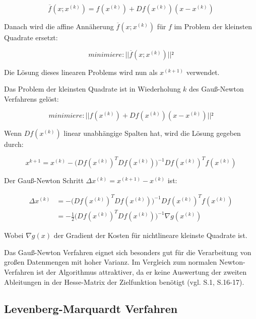 \begin{equation}
\overline{f}(x;x^{(k)}) = f(x^{(k)})+Df(x^{(k)})(x-x^{(k)})
\end{equation}

Danach wird die affine Annäherung $ \overline{f}(x;x^{(k)})$ für $f$ im Problem der kleinsten Quadrate ersetzt:

\begin{equation}
minimiere: ||\overline{f}(x;x^{(k)})||²
\end{equation}

Die Lösung dieses linearen Problems wird nun als $x^{(k+1)}$ verwendet. 

Das Problem der kleinsten Quadrate ist in Wiederholung $k$ des Gauß-Newton Verfahrens gelöst:

\begin{equation}
minimiere: ||f(x^{(k)}) + Df(x^{(k)})(x-x^{(k)})||²
\end{equation}

Wenn $Df(x^{(k)}) $ linear unabhängige Spalten hat, wird die Lösung gegeben durch:

\begin{equation}
x^{k+1} = x^{(k)}-\Big(Df(x^{(k)})^TDf(x^{(k)})\Big)^{-1} Df(x^{(k)})^T f(x^{(k)})
\end{equation}

Der Gauß-Newton Schritt $\Delta x^{(k)} = x^{(k+1)} - x^{(k)}$ ist:

\begin{equation}
\begin{aligned}
\Delta x^{(k)} &= -\Big(Df(x^{(k)})^TDf(x^{(k)})\Big)^{-1} Df(x^{(k)})^T f(x^{(k)})\\ &= -\frac{1}{2} \Big(Df(x^{(k)})^TDf(x^{(k)})\Big)^{-1} \nabla g(x^{(k)})
\end{aligned}
\end{equation}

Wobei $\nabla g(x)$ der Gradient der Kosten für nichtlineare kleinste Quadrate ist.

Das Gauß-Newton Verfahren eignet sich besonders gut für die Verarbeitung von großen Datenmengen mit hoher Varianz. Im Vergleich zum normalen Newton-Verfahren ist der Algorithmus attraktiver, da er keine Auswertung der zweiten Ableitungen in der Hesse-Matrix der Zielfunktion benötigt (vgl. \cite{approx_gn} S.1, \cite{nonlinear_1} S.16-17).


\subsection{Levenberg-Marquardt Verfahren}

